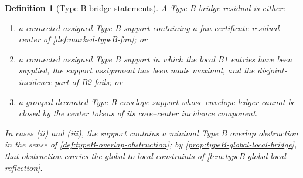\documentclass[11pt]{article}
\newtheorem{definition}[theorem]{Definition}
\begin{document}
\begin{definition}[Type B bridge statements]
A \emph{Type B bridge residual} is either:
\begin{enumerate}[label=(\roman*), leftmargin=2.2em]
\item a connected assigned Type B support containing a fan-certificate residual
center of \cref{def:marked-typeB-fan}; or
\item a connected assigned Type B support in which the local B1 entries have
been supplied, the support assignment has been made maximal, and the
disjoint-incidence part of B2 fails; or
\item a grouped decorated Type B envelope support whose envelope ledger cannot
be closed by the center tokens of its core--center incidence component.
\end{enumerate}
In cases (ii) and (iii), the support contains a minimal Type B overlap
obstruction in the sense of \cref{def:typeB-overlap-obstruction}; by
\cref{prop:typeB-global-local-bridge}, that obstruction carries the
global-to-local constraints of \cref{lem:typeB-global-local-reflection}.
\end{definition}
\end{document}
